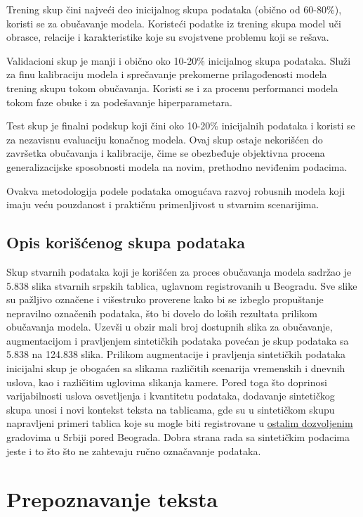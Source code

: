 \documentclass[a4paper,12pt]{article}
\begin{document}
	Trening skup čini najveći deo inicijalnog skupa podataka (obično od 60-80\%), koristi se za obučavanje modela. Koristeći podatke iz trening skupa model uči obrasce, relacije i karakteristike koje su svojstvene problemu koji se rešava.
	
	Validacioni skup je manji i obično oko 10-20\% inicijalnog skupa podataka. Služi za finu kalibraciju modela i sprečavanje prekomerne prilagođenosti modela trening skupu tokom obučavanja. Koristi se i za procenu performanci modela tokom faze obuke i za podešavanje hiperparametara.
	
	Test skup je finalni podskup koji čini oko 10-20\% inicijalnih podataka i koristi se za nezavisnu evaluaciju konačnog modela. Ovaj skup ostaje nekorišćen do završetka obučavanja i kalibracije, čime se obezbeđuje objektivna procena generalizacijske sposobnosti modela na novim, prethodno neviđenim podacima.
	
	Ovakva metodologija podele podataka omogućava razvoj robusnih modela koji imaju veću pouzdanost i praktičnu primenljivost u stvarnim scenarijima.
	
	\subsection{Opis korišćenog skupa podataka}
	Skup stvarnih podataka koji je korišćen za proces obučavanja modela sadržao je 5.838 slika stvarnih srpskih tablica, uglavnom registrovanih u Beogradu. Sve slike su pažljivo označene i višestruko proverene kako bi se izbeglo propuštanje nepravilno označenih podataka, što bi dovelo do loših rezultata prilikom obučavanja modela. Uzevši u obzir mali broj dostupnih slika za obučavanje, augmentacijom i pravljenjem sintetičkih podataka povećan je skup podataka sa 5.838 na 124.838 slika. Prilikom augmentacije i pravljenja sintetičkih podataka inicijalni skup je obogaćen sa slikama različitih scenarija vremenskih i dnevnih uslova, kao i različitim uglovima slikanja kamere. Pored toga što doprinosi varijabilnosti uslova osvetljenja i kvantitetu podataka, dodavanje sintetičkog skupa unosi i novi kontekst teksta na tablicama, gde su u sintetičkom skupu napravljeni primeri tablica koje su mogle biti registrovane u \href{https://www.super-registracija-vozila.rs/registarske-oznake-u-srbiji}{ostalim dozvoljenim} \cite{srbRegistracija} gradovima u Srbiji pored Beograda. Dobra strana rada sa sintetičkim podacima jeste i to što što ne zahtevaju ručno označavanje podataka.
	\newpage
	
	\section{Prepoznavanje teksta}
\end{document}
